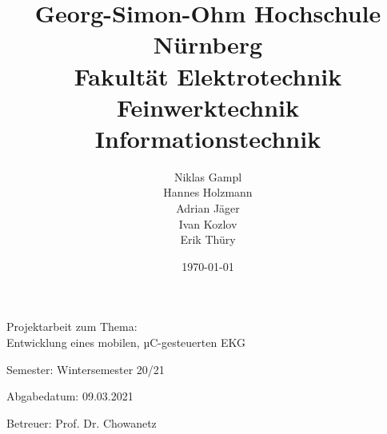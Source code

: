 
\title{Georg-Simon-Ohm Hochschule Nürnberg\\Fakultät Elektrotechnik Feinwerktechnik Informationstechnik}
\author{Niklas Gampl\\Hannes Holzmann\\Adrian Jäger\\Ivan Kozlov\\Erik Thüry}
\date{\today}
\maketitle

\noindent
\begin{center}
    \Large{Projektarbeit zum Thema:\\
    Entwicklung eines mobilen, µC-gesteuerten EKG}
\end{center}
\normalsize

\vfill

\noindent
Semester: Wintersemester 20/21

\noindent
Abgabedatum: 09.03.2021

\noindent
Betreuer: Prof. Dr. Chowanetz
